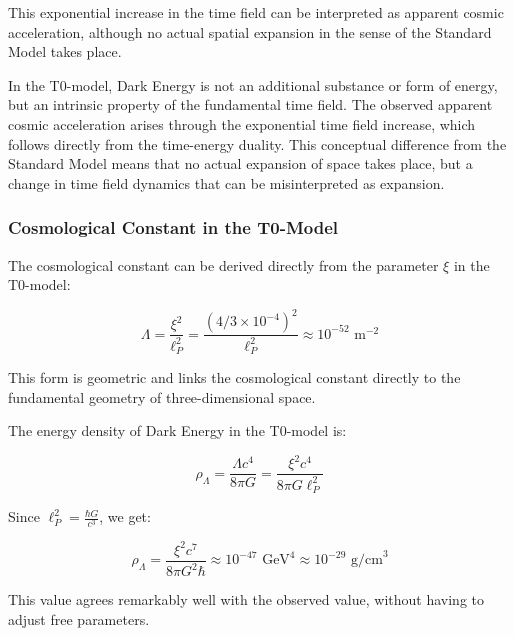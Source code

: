 \documentclass[12pt,a4paper]{article}
\theoremstyle{definition}
\begin{document}
	This exponential increase in the time field can be interpreted as apparent cosmic acceleration, although no actual spatial expansion in the sense of the Standard Model takes place.
	
	\begin{wichtig}
		In the T0-model, Dark Energy is not an additional substance or form of energy, but an intrinsic property of the fundamental time field. The observed apparent cosmic acceleration arises through the exponential time field increase, which follows directly from the time-energy duality. This conceptual difference from the Standard Model means that no actual expansion of space takes place, but a change in time field dynamics that can be misinterpreted as expansion.
	\end{wichtig}
	
	\subsubsection{Cosmological Constant in the T0-Model}
	
	The cosmological constant can be derived directly from the parameter $\xi$ in the T0-model:
	
	\begin{equation}
		\boxed{\Lambda = \frac{\xi^2}{\ell_P^2} = \frac{(4/3 \times 10^{-4})^2}{\ell_P^2} \approx 10^{-52} \text{ m}^{-2}}
	\end{equation}
	
	This form is geometric and links the cosmological constant directly to the fundamental geometry of three-dimensional space.
	
	\begin{verhaltnis}
		The energy density of Dark Energy in the T0-model is:
		
		\begin{equation}
			\rho_\Lambda = \frac{\Lambda c^4}{8\pi G} = \frac{\xi^2 c^4}{8\pi G \ell_P^2}
		\end{equation}
		
		Since $\ell_P^2 = \frac{\hbar G}{c^3}$, we get:
		
		\begin{equation}
			\rho_\Lambda = \frac{\xi^2 c^7}{8\pi G^2 \hbar} \approx 10^{-47} \text{ GeV}^4 \approx 10^{-29} \text{ g/cm}^3
		\end{equation}
		
		This value agrees remarkably well with the observed value, without having to adjust free parameters.
	\end{verhaltnis}
	
\end{document}
